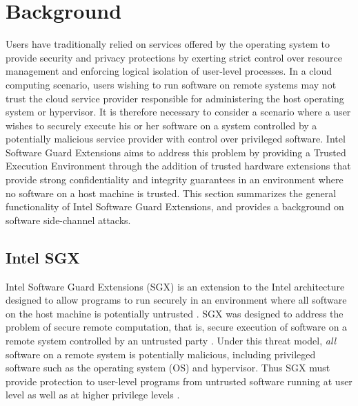 \section{Background}

Users have traditionally relied on services offered by the operating system to provide security and privacy protections by exerting strict control over resource management and enforcing logical isolation of user-level processes. In a cloud computing scenario, users wishing to run software on remote systems may not trust the cloud service provider responsible for administering the host operating system or hypervisor. It is therefore necessary to consider a scenario where a user wishes to securely execute his or her software on a system controlled by a potentially malicious service provider with control over privileged software. Intel Software Guard Extensions aims to address this problem by providing a Trusted Execution Environment through the addition of trusted hardware extensions that provide strong confidentiality and integrity guarantees in an environment where no software on a host machine is trusted. This section summarizes the general functionality of Intel Software Guard Extensions, and provides a background on software side-channel attacks.

\subsection{Intel SGX}

Intel Software Guard Extensions (SGX) is an extension to the Intel architecture designed to allow programs to run securely in an environment where all software on the host machine is potentially untrusted \cite{intel_corporation_intel_2016}. SGX was designed to address the problem of secure remote computation, that is, secure execution of software on a remote system controlled by an untrusted party \cite{intel_corporation_intel_2016}. Under this threat model, \emph{all} software on a remote system is potentially malicious, including privileged software such as the operating system (OS) and hypervisor. Thus SGX must provide protection to user-level programs from untrusted software running at user level as well as at higher privilege levels \cite{costan_intel_2016}. 

